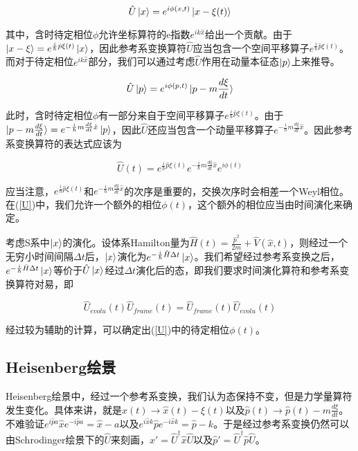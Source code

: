 \documentclass[a4paper]{article}
\begin{document}
    \begin{equation}
        \hat{U}\ket{x}=e^{i\phi(x,t)}\ket{x-\xi(t)}
    \end{equation}

    其中，含时待定相位$\phi$允许坐标算符的e指数$e^{ik\hat{x}}$给出一个贡献。由于$\ket{x-\xi}=e^{\frac{i}{\hbar}\hat{p}\xi(t)}\ket{x}$，因此参考系变换算符$\hat{U}$应当包含一个空间平移算子$e^{\frac{i}{\hbar}\hat{p}\xi(t)}$。而对于待定相位$e^{ik\hat{x}}$部分，我们可以通过考虑$\hat{U}$作用在动量本征态$\ket{p}$上来推导。

    \begin{equation}
        \hat{U}\ket{p}=e^{i\phi(p,t)}\ket{p-m\frac{d\xi}{dt}}
    \end{equation}

    此时，含时待定相位$\phi$有一部分来自于空间平移算子$e^{\frac{i}{\hbar}\hat{p}\xi(t)}$。由于$\ket{p-m\frac{d\xi}{dt}}=e^{-\frac{i}{\hbar}m\frac{d\xi}{dt}\hat{x}}\ket{p}$，因此$\hat{U}$还应当包含一个动量平移算子$e^{-\frac{i}{\hbar}m\frac{d\xi}{dt}\hat{x}}$。因此参考系变换算符的表达式应该为

    \begin{equation}\label{U}
        \hat{U}(t)=e^{\frac{i}{\hbar}\hat{p}\xi(t)}e^{-\frac{i}{\hbar}m\frac{d\xi}{dt}\hat{x}}e^{i\phi(t)}
    \end{equation}

    应当注意，$e^{\frac{i}{\hbar}\hat{p}\xi(t)}$和$e^{-\frac{i}{\hbar}m\frac{d\xi}{dt}\hat{x}}$的次序是重要的，交换次序时会相差一个Weyl相位。在(\ref{U})中，我们允许一个额外的相位$\phi(t)$，这个额外的相位应当由时间演化来确定。

    考虑S系中$\ket{x}$的演化。设体系Hamilton量为$\hat{H}(t)=\frac{\hat{p}^2}{2m}+\hat{V}(\hat{x},t)$，则经过一个无穷小时间间隔$\Delta t$后，$\ket{x}$演化为$e^{-\frac{i}{\hbar}\hat{H}\Delta t}\ket{x}$。我们希望经过参考系变换之后，$e^{-\frac{i}{\hbar}\hat{H}\Delta t}\ket{x}$等价于$\hat{U}\ket{x}$经过$\Delta t$演化后的态，即我们要求时间演化算符和参考系变换算符对易，即

    \begin{equation}
        \hat{U}_{evolu}(t)\hat{U}_{frame}(t)=\hat{U}_{frame}(t)\hat{U}_{evolu}(t)
    \end{equation}

    经过较为辅助的计算，可以确定出(\ref{U})中的待定相位$\phi(t)$。

\subsection{Heisenberg绘景}
    Heisenberg绘景中，经过一个参考系变换，我们认为态保持不变，但是力学量算符发生变化。具体来讲，就是$\hat{x}(t)\to\hat{x}(t)-\xi(t)$以及$\hat{p}(t)\to\hat{p}(t)-m\frac{d\xi}{dt}$。不难验证$e^{i\hat{p}a}\hat{x}e^{-i\hat{p}a}=\hat{x}-a$以及$e^{i\hat{x}k}\hat{p}e^{-i\hat{x}k}=\hat{p}-k$。于是经过参考系变换仍然可以由Schrodinger绘景下的$\hat{U}$来刻画，$\hat{x}'=\hat{U}^\dagger\hat{x}\hat{U}$以及$\hat{p}'=\hat{U}^\dagger\hat{p}\hat{U}$。
\end{document}
